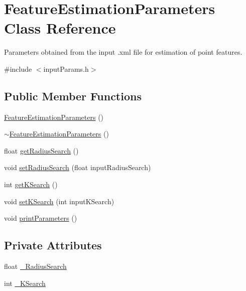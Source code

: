 \hypertarget{classFeatureEstimationParameters}{\section{Feature\-Estimation\-Parameters Class Reference}
\label{classFeatureEstimationParameters}
}


Parameters obtained from the input .xml file for estimation of point features.  




{\ttfamily \#include $<$input\-Params.\-h$>$}

\subsection*{Public Member Functions}
\begin{DoxyCompactItemize}
\item 
\hyperlink{classFeatureEstimationParameters_a113bf33c1c3979ae4c8591c476228b97}{Feature\-Estimation\-Parameters} ()
\item 
\hyperlink{classFeatureEstimationParameters_a4913204b49771591c812a3bdac3f6cd8}{$\sim$\-Feature\-Estimation\-Parameters} ()
\item 
float \hyperlink{classFeatureEstimationParameters_aa4716c8d2fa43f3a0aea01c89bbb0085}{get\-Radius\-Search} ()
\item 
void \hyperlink{classFeatureEstimationParameters_a6807492ebdbf5b7c87a3bce8d34886d2}{set\-Radius\-Search} (float input\-Radius\-Search)
\item 
int \hyperlink{classFeatureEstimationParameters_a84002f3320e3e7d5f73660ce50e57e72}{get\-K\-Search} ()
\item 
void \hyperlink{classFeatureEstimationParameters_a4efbd0a06f20fb9faad9ef32c65b02ea}{set\-K\-Search} (int input\-K\-Search)
\item 
void \hyperlink{classFeatureEstimationParameters_a97c47d82dc92c5726bfcf4123159ff12}{print\-Parameters} ()
\end{DoxyCompactItemize}
\subsection*{Private Attributes}
\begin{DoxyCompactItemize}
\item 
float \hyperlink{classFeatureEstimationParameters_a75aed39eda19a3003041f765d9c346cf}{\-\_\-\-Radius\-Search}
\item 
int \hyperlink{classFeatureEstimationParameters_abd46d4a1816d3afcc7b6f70c400444f3}{\-\_\-\-K\-Search}
\end{DoxyCompactItemize}


